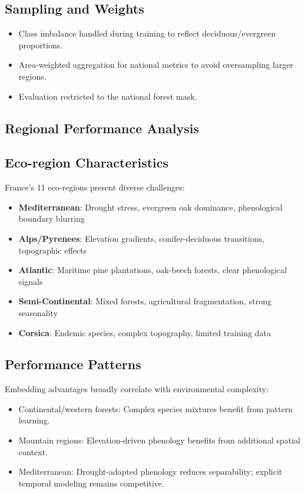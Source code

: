 \documentclass[utf8]{frontiers_suppmat}
\begin{document}
\subsection{Sampling and Weights}
\begin{itemize}
  \item Class imbalance handled during training to reflect deciduous/evergreen proportions.
  \item Area-weighted aggregation for national metrics to avoid oversampling larger regions.
  \item Evaluation restricted to the national forest mask.
\end{itemize}

\subsection{Regional Performance Analysis}

\subsection{Eco-region Characteristics}
France's 11 eco-regions present diverse challenges:
\begin{itemize}
    \item \textbf{Mediterranean}: Drought stress, evergreen oak dominance, phenological boundary blurring
    \item \textbf{Alps/Pyrenees}: Elevation gradients, conifer-deciduous transitions, topographic effects
    \item \textbf{Atlantic}: Maritime pine plantations, oak-beech forests, clear phenological signals
    \item \textbf{Semi-Continental}: Mixed forests, agricultural fragmentation, strong seasonality
    \item \textbf{Corsica}: Endemic species, complex topography, limited training data
\end{itemize}

\subsection{Performance Patterns}
Embedding advantages broadly correlate with environmental complexity:
\begin{itemize}
    \item Continental/western forests: Complex species mixtures benefit from pattern learning.
    \item Mountain regions: Elevation-driven phenology benefits from additional spatial context.
    \item Mediterranean: Drought-adapted phenology reduces separability; explicit temporal modeling remains competitive.
\end{itemize}
\end{document}
